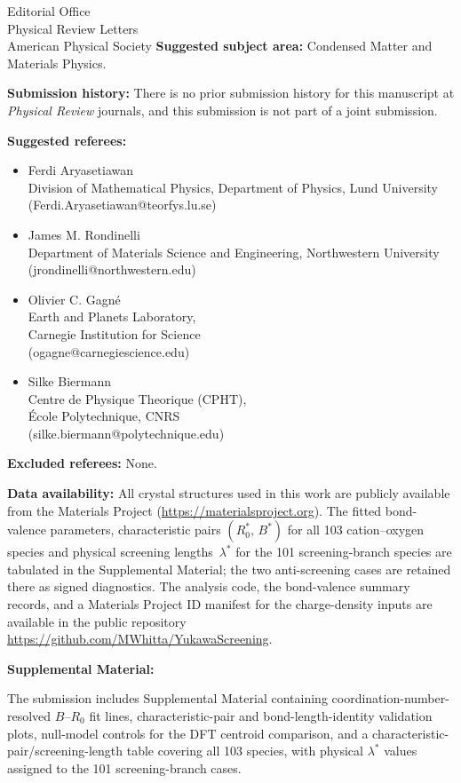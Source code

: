 \documentclass[11pt]{letter}
\begin{document}
\begin{letter}{Editorial Office\\Physical Review Letters\\American Physical Society}
\textbf{Suggested subject area:} Condensed Matter and Materials Physics.

\textbf{Submission history:} There is no prior submission history for
this manuscript at \textit{Physical Review} journals, and this
submission is not part of a joint submission.

\textbf{Suggested referees:}
\begin{itemize}[leftmargin=1.5em,itemsep=2pt,parsep=0pt]
\item Ferdi Aryasetiawan\\
  Division of Mathematical Physics, Department of Physics, Lund University\\
  (Ferdi.Aryasetiawan@teorfys.lu.se)
\item James M. Rondinelli\\
  Department of Materials Science and Engineering, Northwestern University\\
  (jrondinelli@northwestern.edu)
\item Olivier C. Gagn\'e\\
  Earth and Planets Laboratory,\\
  Carnegie Institution for Science\\
  (ogagne@carnegiescience.edu)
\item Silke Biermann\\
  Centre de Physique Theorique (CPHT),\\
  \'{E}cole Polytechnique, CNRS\\
  (silke.biermann@polytechnique.edu)
\end{itemize}

\textbf{Excluded referees:} None.

\textbf{Data availability:} All crystal structures used in this work
are publicly available from the Materials Project
(\url{https://materialsproject.org}).  The fitted bond-valence
parameters, characteristic pairs $(R_0^*,\,B^*)$ for all 103
cation--oxygen species and physical screening lengths~$\lambda^*$ for
the 101 screening-branch species are tabulated in the Supplemental
Material; the two anti-screening cases are retained there as signed
diagnostics.  The analysis code, the bond-valence summary records, and
a Materials Project ID manifest for the charge-density inputs are
available in the public repository
\url{https://github.com/MWhitta/YukawaScreening}.

\textbf{Supplemental Material:}

The submission includes Supplemental Material containing
coordination-number-resolved $B$--$R_0$ fit lines, characteristic-pair
and bond-length-identity validation plots, null-model controls for the
DFT centroid comparison, and a characteristic-pair/screening-length
table covering all 103 species, with physical $\lambda^*$ values
assigned to the 101 screening-branch cases.


\end{letter}
\end{document}
